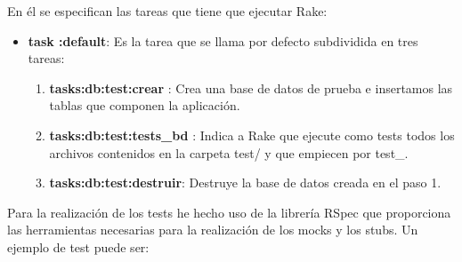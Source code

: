 En él se especifican las tareas que tiene que ejecutar Rake:
\begin{itemize}
\item \textbf{task :default}: Es la tarea que se llama por defecto subdividida en tres tareas:
\begin{enumerate}
\item \textbf{tasks:db:test:crear} : Crea una base de datos de prueba e insertamos las tablas que componen la aplicación.
\item \textbf{tasks:db:test:tests\_bd} : Indica a Rake que ejecute como tests todos los archivos contenidos en la carpeta test/ y que empiecen por test\_.
\item \textbf{tasks:db:test:destruir}: Destruye la base de datos creada en el paso 1.
\end{enumerate}

\end{itemize}

Para la realización de los tests he hecho uso de la librería RSpec que proporciona las herramientas necesarias para la realización de los mocks y los stubs. Un ejemplo de test puede ser:


